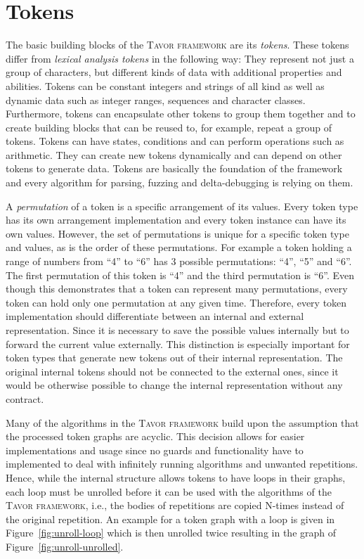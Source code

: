 \section{Tokens}
\label{sec:tokens}

The basic building blocks of the \textsc{Tavor framework} are its \emph{tokens}. These tokens differ from \emph{lexical analysis tokens} in the following way: They represent not just a group of characters, but different kinds of data with additional properties and abilities. Tokens can be constant integers and strings of all kind as well as dynamic data such as integer ranges, sequences and character classes. Furthermore, tokens can encapsulate other tokens to group them together and to create building blocks that can be reused to, for example, repeat a group of tokens. Tokens can have states, conditions and can perform operations such as arithmetic. They can create new tokens dynamically and can depend on other tokens to generate data. Tokens are basically the foundation of the framework and every algorithm for parsing, fuzzing and delta-debugging is relying on them.

A \emph{permutation} of a token is a specific arrangement of its values. Every token type has its own arrangement implementation and every token instance can have its own values. However, the set of permutations is unique for a specific token type and values, as is the order of these permutations. For example a token holding a range of numbers from \enquote{4} to \enquote{6} has 3 possible permutations: \enquote{4}, \enquote{5} and \enquote{6}. The first permutation of this token is \enquote{4} and the third permutation is \enquote{6}. Even though this demonstrates that a token can represent many permutations, every token can hold only one permutation at any given time. Therefore, every token implementation should differentiate between an internal and external representation. Since it is necessary to save the possible values internally but to forward the current value externally. This distinction is especially important for token types that generate new tokens out of their internal representation. The original internal tokens should not be connected to the external ones, since it would be otherwise possible to change the internal representation without any contract.

Many of the algorithms in the \textsc{Tavor framework} build upon the assumption that the processed token graphs are acyclic. This decision allows for easier implementations and usage since no guards and functionality have to implemented to deal with infinitely running algorithms and unwanted repetitions. Hence, while the internal structure allows tokens to have loops in their graphs, each loop must be unrolled before it can be used with the algorithms of the \textsc{Tavor framework}, i.e., the bodies of repetitions are copied N-times instead of the original repetition. An example for a token graph with a loop is given in Figure~\ref{fig:unroll-loop} which is then unrolled twice resulting in the graph of Figure~\ref{fig:unroll-unrolled}.

